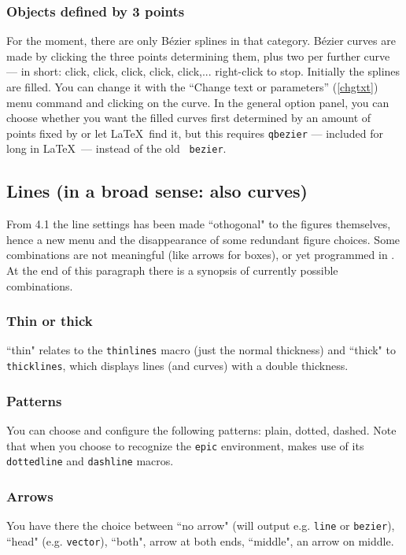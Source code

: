 \documentclass[11pt,a4paper]{article}
\begin{document}
\subsubsection{Objects defined by 3 points}
%
For the moment, there are only B\'ezier splines in that category.
B\'ezier curves are made by clicking the three points determining them,
plus two per further curve
--- in short: click, click, click, click, click,... right-click to
stop.
Initially the splines are filled. You can change it with the
``Change text or parameters'' (\ref{chgtxt}) menu command and clicking on the
curve. In the general option panel, you can choose whether you want
the filled curves first determined by an amount of points fixed by {\TC} or let \LaTeX\, find it, but this requires {\tt \bs qbezier} ---
included for long in \LaTeX\, --- instead of the old {\tt \bs
bezier}.
%
\subsection{Lines (in a broad sense: also curves)}
From {\TC} 4.1 the line settings has been made ``othogonal" to the figures
themselves, hence a new menu and the disappearance of some redundant
figure choices. Some combinations are not meaningful
(like arrows for boxes), or yet programmed in {\TC}.
At the end of this paragraph there is a synopsis of currently possible combinations.
%
\subsubsection{Thin or thick}
``thin" relates to the {\tt \bs thinlines} macro (just the normal thickness)
and ``thick" to {\tt \bs thicklines}, which displays lines (and curves)
with a double thickness.
%
\subsubsection{Patterns}
You can choose and configure the following patterns:
plain, dotted, dashed. Note that when you choose to recognize
the {\tt epic} environment, {\TC} makes use of its
{\tt \bs dottedline} and {\tt \bs dashline} macros.
%
\subsubsection{Arrows}
%
You have there the choice between ``no arrow" (will output e.g. {\tt \bs line}
or {\tt \bs bezier}), ``head" (e.g. {\tt \bs vector}), ``both", arrow at both ends,
``middle", an arrow on middle.
%
\end{document}
